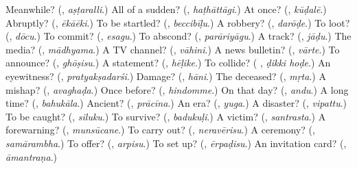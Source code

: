\begin{tcolorbox}[breakable,colback=teal!4,colframe=teal!35!black,title={Before you move on}]
Meanwhile? (\textbf{}, \emph{aṣṭaralli}.) All of a sudden? (\textbf{}, \emph{haṭhāttāgi}.) At once? (\textbf{}, \emph{kūḍalē}.) Abruptly? (\textbf{}, \emph{ēkāēki}.) To be startled? (\textbf{}, \emph{beccibīḷu}.) A robbery? (\textbf{}, \emph{darōḍe}.) To loot? (\textbf{}, \emph{dōcu}.) To commit? (\textbf{}, \emph{esagu}.) To abscond? (\textbf{}, \emph{parāriyāgu}.) A track? (\textbf{}, \emph{jāḍu}.) The media? (\textbf{}, \emph{mādhyama}.) A TV channel? (\textbf{}, \emph{vāhini}.) A news bulletin? (\textbf{}, \emph{vārte}.) To announce? (\textbf{}, \emph{ghōṣisu}.) A statement? (\textbf{}, \emph{hēḷike}.) To collide? (\textbf{ }, \emph{ḍikki hoḍe}.) An eyewitness? (\textbf{}, \emph{pratyakṣadarśi}.) Damage? (\textbf{}, \emph{hāni}.) The deceased? (\textbf{}, \emph{mṛta}.) A mishap? (\textbf{}, \emph{avaghaḍa}.) Once before? (\textbf{}, \emph{hindomme}.) On that day? (\textbf{}, \emph{andu}.) A long time? (\textbf{}, \emph{bahukāla}.) Ancient? (\textbf{}, \emph{prācīna}.) An era? (\textbf{}, \emph{yuga}.) A disaster? (\textbf{}, \emph{vipattu}.) To be caught? (\textbf{}, \emph{siluku}.) To survive? (\textbf{}, \emph{badukuḷi}.) A victim? (\textbf{}, \emph{santrasta}.) A forewarning? (\textbf{}, \emph{munsūcane}.) To carry out? (\textbf{}, \emph{neravērisu}.) A ceremony? (\textbf{}, \emph{samārambha}.) To offer? (\textbf{}, \emph{arpisu}.) To set up? (\textbf{}, \emph{ērpaḍisu}.) An invitation card? (\textbf{}, \emph{āmantraṇa}.)
\end{tcolorbox}
